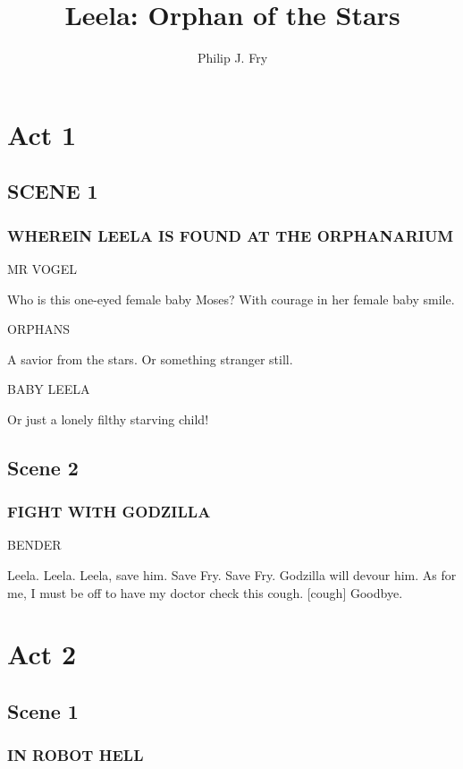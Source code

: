 \documentclass[12pt]{article}
\title{Leela: Orphan of the Stars}
\author{Philip J. Fry}
\begin{document}
\maketitle

\section*{Act 1}

\subsection*{SCENE 1}

\subsubsection*{WHEREIN LEELA IS FOUND AT THE ORPHANARIUM}

MR VOGEL

Who is this one-eyed female baby Moses?
With courage in her female baby smile.

ORPHANS

A savior from the stars.
Or something stranger still.

BABY LEELA

Or just a lonely filthy starving child!

\subsection*{Scene 2}

\subsubsection*{FIGHT WITH GODZILLA}

BENDER

Leela. Leela. Leela, save him.
Save Fry. Save Fry.
Godzilla will devour him.
As for me, I must be off
to have my doctor check this cough.
[cough] Goodbye.

\section*{Act 2}

\subsection*{Scene 1}

\subsubsection*{IN ROBOT HELL}
\end{document}
